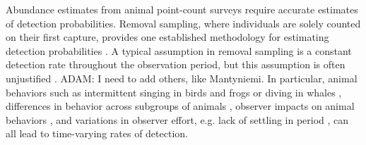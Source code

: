 \documentclass[useAMS,usenatbib,referee,12pt]{article}
\newcommand{\adam}[1]{{\color{blue} ADAM: #1}}
\newcommand{\jarad}[1]{{\color{Orange} JARAD: #1}}
\begin{document}
Abundance estimates from animal point-count surveys require accurate estimates of detection probabilities.  
Removal sampling, where individuals are solely counted on their first capture, provides one established methodology for estimating detection probabilities \citep{Farnsworth2002}.
A typical assumption in removal sampling is a constant detection rate throughout the observation period, but this assumption is often unjustified \citep{Alldredge2007}. \adam{I need to add others, like Mantyniemi.}  
In particular, animal behaviors such as intermittent singing in birds and frogs or diving in whales \citep{Scott2005, Diefenbach2007, Reidy2011}, differences in behavior across subgroups of animals \citep{Farnsworth2005}, observer impacts on animal behaviors \citep{McSheaRappole1997, Rosenstock2002, Alldredge2007}, and variations in observer effort, e.g. lack of settling in period \citep{LeeMarsden2008, Johnson2008}, can all lead to time-varying rates of detection.
\end{document}
